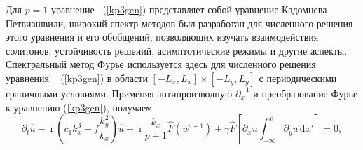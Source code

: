 Для $ p = 1 $ уравнение ~(\ref {kp3gen}) представляет собой уравнение Кадомцева-Петвиашвили, широкий спектр методов \cite{porrogue, Lu2003, Klein2007, Infeld1995, Kao2012, Kodama2009} был разработан для численного решения этого уравнения и его обобщений, позволяющих изучать взаимодействия солитонов, устойчивость решений, асимптотические режимы и другие аспекты. 
Спектральный метод Фурье используется здесь для численного решения уравнения ~ (\ref {kp3gen}) в области $\left[-L_x, L_x\right] \times \left[-L_y, L_y\right]$ с периодическими граничными условиями. Применяя антипроизводную $\partial_x^{-1}$ и преобразование Фурье к уравнению (\ref {kp3gen}), получаем
\begin{equation}
	\label{KP3F}
	\partial_t \hat{u} - \imath\left( c_1 k_x^3 - f \frac{k_y^2}{k_x} \right) \hat{u} + \imath \frac{k_x}{p+1} \hat{F} \left(u^{p+1}\right)+\gamma \hat{F} \left[\partial_x u \int_{-\infty}^x \partial_y u \, \mathrm{d}x'\right]=0, 
\end{equation}
